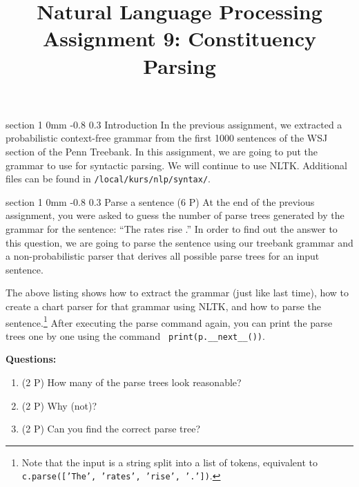 \documentclass[11pt]{article}
\title{{\LARGE Natural Language Processing}\\[1.5mm]{\large Assignment 9: Constituency Parsing}}
\author{}
\date{} %
\makeatletter
\newcommand{\newsec}[2]{\section{#1}\label{sec:#2}\noindent}
\renewcommand{\section}{\@startsection
{section}%
{1}%
{0mm}%
{-0.8\baselineskip}%
{0.3\baselineskip}%
{\bfseries\large}}%
\makeatother
\begin{document}
 

\maketitle
\vspace{-2mm} \newsec{Introduction}{intro}%
In the previous assignment, we extracted a probabilistic context-free
grammar from the first 1000 sentences of the WSJ section of the Penn
Treebank.  In this assignment, we are going to put the grammar to use
for syntactic parsing. We will continue to use NLTK.  Additional files
can be found in {\tt /local/kurs/nlp/syntax/}.

\newsec{Parse a sentence (6 P)}{chart}%
At the end of the previous assignment, you were asked to guess the
number of parse trees generated by the grammar for the sentence: ``The
rates rise .''  In order to find out the answer to this question, we
are going to parse the sentence using our treebank grammar and a
non-probabilistic parser that derives all possible parse trees for an
input sentence.
\begin{center}
\fbox{

}
\end{center}
The above listing shows how to extract the grammar (just like last
time), how to create a chart parser for that grammar using NLTK, and
how to parse the sentence.\footnote{Note that the input is a string
  split into a list of tokens, equivalent to {\tt c.parse(['The',
    'rates', 'rise', '.'])}.}  After executing the parse command
again, you can print the parse trees one by one using the command {\tt
  print(p.\_\_next\_\_())}.
\begin{center}
\fbox{

}
\end{center}
{\bf Questions:} 
\begin{enumerate}[noitemsep,topsep=0.2cm]
\item (2 P) How many of the parse trees look reasonable?
\item (2 P) Why (not)?
\item (2 P) Can you find the correct parse tree?
\end{enumerate}
\end{document}
